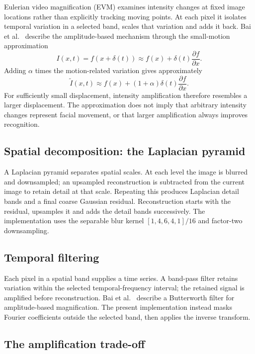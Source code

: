 Eulerian video magnification (EVM) examines intensity changes at fixed image locations rather than explicitly tracking moving points. At each pixel it isolates temporal variation in a selected band, scales that variation and adds it back. Bai et al.~\cite{bai2021} describe the amplitude-based mechanism through the small-motion approximation
\[
    I(x,t)=f(x+\delta(t))
       \approx f(x)+\delta(t)\frac{\partial f}{\partial x}.
\]
Adding $\alpha$ times the motion-related variation gives approximately
\[
    \widetilde I(x,t)\approx
       f(x)+(1+\alpha)\delta(t)\frac{\partial f}{\partial x}.
\]
For sufficiently small displacement, intensity amplification therefore resembles a larger displacement. The approximation does not imply that arbitrary intensity changes represent facial movement, or that larger amplification always improves recognition.

\subsection{Spatial decomposition: the Laplacian pyramid}
\label{sec:laplacian-pyramid}

A Laplacian pyramid separates spatial scales. At each level the image is blurred and downsampled; an upsampled reconstruction is subtracted from the current image to retain detail at that scale. Repeating this produces Laplacian detail bands and a final coarse Gaussian residual. Reconstruction starts with the residual, upsamples it and adds the detail bands successively. The implementation uses the separable blur kernel $[1,4,6,4,1]/16$ and factor-two downsampling.

\subsection{Temporal filtering}
\label{sec:temporal-filtering}

Each pixel in a spatial band supplies a time series. A band-pass filter retains variation within the selected temporal-frequency interval; the retained signal is amplified before reconstruction. Bai et al.~\cite{bai2021} describe a Butterworth filter for amplitude-based magnification. The present implementation instead masks Fourier coefficients outside the selected band, then applies the inverse transform.

\subsection{The amplification trade-off}
\label{sec:amplification-tradeoff}

